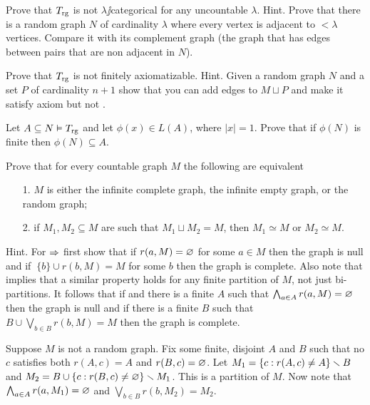 \documentclass[creche.tex]{subfiles}
\begin{document}
%

\begin{exercise}
Prove that $T_{\rm rg}$ is not $\lambda\jj$categorical for any uncountable $\lambda$. Hint. Prove that there is a random graph $N$ of cardinality $\lambda$ where every vertex is adjacent to $<\lambda$ vertices. Compare it with its complement graph (the graph that has edges between pairs that are non adjacent in $N$).\QED
\end{exercise}

\begin{exercise}
Prove that $T_{\rm rg}$ is not finitely axiomatizable. Hint. Given a random graph $N$ and a set $P$ of cardinality $n+1$ show that you can add edges to $M\sqcup P$ and make it satisfy axiom  but not .\QED
\end{exercise}

\begin{exercise}\label{ex_rg_small_def_set}
Let $A\subseteq N\models T_{\rm rg}$ and let $\phi(x)\in L(A)$, where $|x|=1$. Prove that if $\phi(N)$ is finite then $\phi(N)\subseteq A$.\QED
\end{exercise}

\begin{exercise}
Prove that for every countable graph $M$ the following are equivalent
\begin{itemize}
\item[1.] $M$ is either the infinite complete graph, the infinite empty graph, or the random graph;
\item[2.] if $M_1,M_2\subseteq M$ are such that $M_1\sqcup M_2=M$, then $M_1\simeq M$ or $M_2\simeq M$.
\end{itemize}
Hint. For $\IMP$ first show that if $r(a,M)=\0$ for some $a\in M$ then the graph is null and if $\
\{b\}\cup r(b,M)=M$ for some $b$ then the graph is complete. Also note that  implies that a similar property holds for any finite partition of $M$, not just bi-partitions. It follows that if  and there is a finite $A$ such that $\bigwedge_{a\in A}r(a, M)=\0$ then the graph is null and if there is a finite $B$ such that $B\cup\bigvee_{b\in B}r(b,M)=M$ then the graph is complete. 

Suppose $M$ is not a random graph. Fix some finite, disjoint $A$ and $B$ such that no $c$ satisfies both $r(A,c)= A$ and $r(B,c)=\0$. Let $M_1=\{c:r(A,c)\neq A\}\sm B$ and $M_2=B\cup\{c:r(B,c)\neq\0\}\sm M_1$. This is a partition of $M$. Now note that $\bigwedge_{a\in A}r(a, M_1)=\0$ and $\bigvee_{b\in B}r(b, M_2)=M_2$.\QED
\end{exercise}
\end{document}
